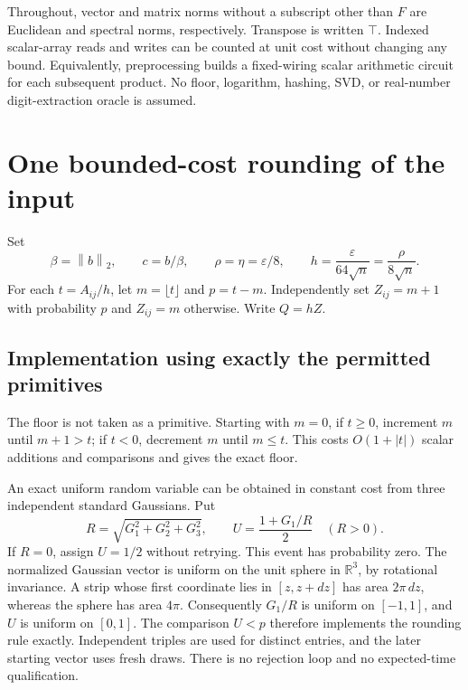 \documentclass[11pt,a4paper]{article}
\theoremstyle{remark}
\newcommand{\R}{\mathbb R}
\newcommand{\eps}{\varepsilon}
\newcommand{\norm}[1]{\left\|#1\right\|_2}
\begin{document}
Throughout, vector and matrix norms without a subscript other than $F$ are
Euclidean and spectral norms, respectively. Transpose is written $\top$.
Indexed scalar-array reads and writes can be counted at unit cost without
changing any bound. Equivalently, preprocessing builds a fixed-wiring scalar
arithmetic circuit for each subsequent product. No floor, logarithm, hashing,
SVD, or real-number digit-extraction oracle is assumed.

\section{One bounded-cost rounding of the input}

Set
\begin{equation}\label{eq:parameters}
 \beta=\norm{b},\qquad c=b/\beta,\qquad
 \rho=\eta=\eps/8,\qquad h=\frac{\eps}{64\sqrt n}
      =\frac{\rho}{8\sqrt n}.
\end{equation}
For each $t=A_{ij}/h$, let $m=\lfloor t\rfloor$ and $p=t-m$.
Independently set $Z_{ij}=m+1$ with probability $p$ and $Z_{ij}=m$ otherwise.
Write $Q=hZ$.

\subsection{Implementation using exactly the permitted primitives}

The floor is not taken as a primitive. Starting with $m=0$, if $t\ge0$,
increment $m$ until $m+1>t$; if $t<0$, decrement $m$ until $m\le t$.
This costs $O(1+|t|)$ scalar additions and comparisons and gives the exact floor.

An exact uniform random variable can be obtained in constant cost from three
independent standard Gaussians. Put
\begin{equation}\label{eq:uniform}
 R=\sqrt{G_1^2+G_2^2+G_3^2},\qquad
 U=\frac{1+G_1/R}{2}\quad(R>0).
\end{equation}
If $R=0$, assign $U=1/2$ without retrying. This event has probability zero.
The normalized Gaussian vector is uniform on the unit sphere in $\R^3$,
by rotational invariance. A strip whose first coordinate lies in
$[z,z+dz]$ has area $2\pi\,dz$, whereas the sphere has area $4\pi$.
Consequently $G_1/R$ is uniform on $[-1,1]$, and $U$ is uniform on $[0,1]$.
The comparison $U<p$ therefore implements the rounding rule exactly. Independent
triples are used for distinct entries, and the later starting vector uses fresh
draws. There is no rejection loop and no expected-time qualification.
\end{document}
